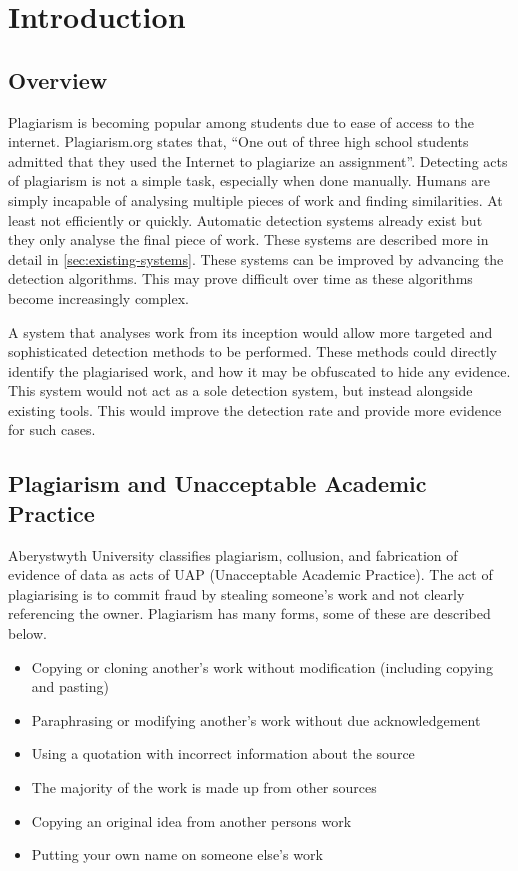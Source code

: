 \chapter{Introduction}
\label{chp:introduction}
\section{Overview}
Plagiarism is becoming popular among students due to ease of access to the internet. Plagiarism.org states that, ``One out of three high school students admitted that they used the Internet to plagiarize an assignment''\cite{PlagiarismorgFacts}. Detecting acts of plagiarism is not a simple task, especially when done manually. Humans are simply incapable of analysing multiple pieces of work and finding similarities. At least not efficiently or quickly. Automatic detection systems already exist but they only analyse the final piece of work. These systems are described more in detail in \autoref{sec:existing-systems}. These systems can be improved by advancing the detection algorithms. This may prove difficult over time as these algorithms become increasingly complex.

A system that analyses work from its inception would allow more targeted and sophisticated detection methods to be performed. These methods could directly identify the plagiarised work, and how it may be obfuscated to hide any evidence. This system would not act as a sole detection system, but instead alongside existing tools. This would improve the detection rate and provide more evidence for such cases.

\section{Plagiarism and Unacceptable Academic Practice}
Aberystwyth University classifies plagiarism, collusion, and fabrication of evidence of data as acts of UAP (Unacceptable Academic Practice)\cite{AberUniUAP}. The act of plagiarising is to commit fraud by stealing someone's work and not clearly referencing the owner\cite{PlagiarismorgWhat}. Plagiarism has many forms, some of these are described below\cite{AberUniUAP}\cite{PlagiarismorgWhat}\cite{TurnitinPlagiarismSpectrum}\cite{Clough03oldand}.

\begin{itemize}
  \item Copying or cloning another's work without modification (including copying and pasting)
  \item Paraphrasing or modifying another's work without due acknowledgement
  \item Using a quotation with incorrect information about the source
  \item The majority of the work is made up from other sources
  \item Copying an original idea from another persons work
  \item Putting your own name on someone else's work  
\end{itemize}

